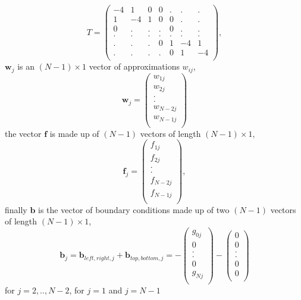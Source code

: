 \[ T=\left(\begin{array}{ccccccc}
-4&1&0&0&.&.&.\\
1&-4&1&0&0&.&.\\
0&.&.&.&0&.&.\\
.&.&.&.&.&.&.\\
.&.&.&0&1&-4&1\\
.&.&.&.&0&1&-4\\
\end{array}\right),
\]
$\mathbf{w}_j$ is an $(N-1)\times 1$ vector of approximations $w_{ij}$,
\[\mathbf{w}_j=\left(\begin{array}{c}
w_{1j}\\
w_{2j}\\
.\\
.\\
w_{N-2j}\\
w_{N-1j}\\
\end{array}\right)
\]
the vector $\mathbf{f}$ is made up of $(N-1)$ vectors of length $(N-1)\times 1,$
\[\mathbf{f}_j =\left(\begin{array}{c}
f_{1j}\\
f_{2j}\\
.\\
.\\
f_{N-2j}\\
f_{N-1j}\\
\end{array}\right),
\]
finally $\mathbf{b}$ is the vector of 
boundary conditions made up of two $(N-1)$ vectors of length $(N-1)\times 1$,
\[\mathbf{b}_j =\mathbf{b}_{left,right,j}+\mathbf{b}_{top,bottom,j }=-\left(\begin{array}{c}
g_{0j}\\
0\\
.\\
.\\
0\\
g_{Nj}\\
\end{array}\right)-\left(\begin{array}{c}
0\\
0\\
.\\
.\\
0\\
0\\
\end{array}\right)
\]
for $j=2,..,N-2$, for $j=1$ and $j=N-1$ 
